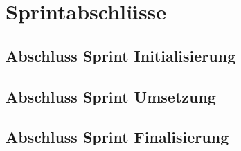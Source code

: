 \chapter{Sprintabschlüsse}

\section{Abschluss Sprint Initialisierung}

\section{Abschluss Sprint Umsetzung}

\section{Abschluss Sprint Finalisierung}


